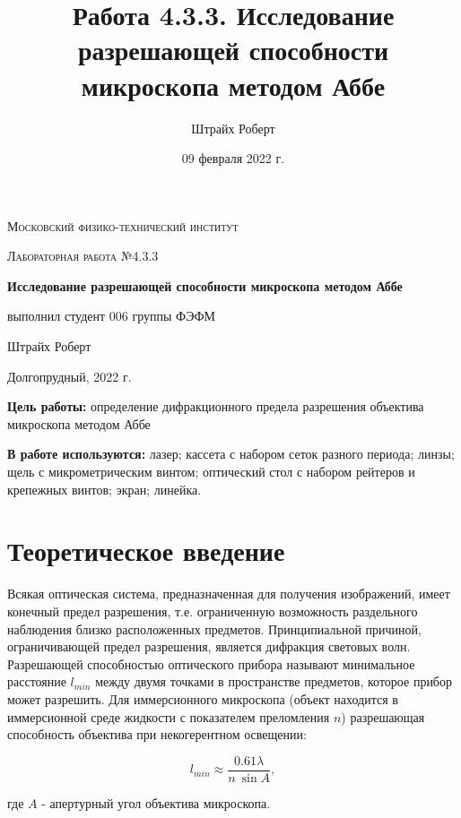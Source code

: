 \documentclass[a4paper, 12pt]{article}
\author{Штрайх Роберт}
\title{Работа 4.3.3. Исследование разрешающей способности микроскопа методом Аббе}
\date{09 февраля 2022 г.}
\begin{document}
\begin{titlepage}
	\centering
	\vspace{5cm}
	{\scshape\LARGE Московский физико-технический институт \par}
	\vspace{4cm}
	{\scshape\Large Лабораторная работа №4.3.3 \par}
	\vspace{1cm}
	{\huge\bfseries Исследование разрешающей способности микроскопа методом Аббе\par}
	\vspace{1cm}
	\vfill
\begin{flushright}
	{\Large выполнил студент 006 группы ФЭФМ}\par
	\vspace{0.3cm}
	{\Large Штрайх Роберт}
\end{flushright}
	

	\vfill

	Долгопрудный, 2022 г.
\end{titlepage}

\newpage

\textbf{Цель работы:} определение дифракционного предела разрешения объектива микроскопа методом Аббе

\textbf{В работе используются:} лазер; кассета с набором сеток разного периода; линзы; щель с микрометрическим винтом; оптический стол с набором рейтеров и крепежных винтов; экран; линейка.

\section*{Теоретическое введение}

Всякая оптическая система, предназначенная для получения изображений, имеет конечный
предел разрешения, т.е. ограниченную возможность раздельного наблюдения близко расположенных
предметов. Принципиальной причиной, ограничивающей предел разрешения, является дифракция
световых волн. Разрешающей способностью оптического прибора называют минимальное
расстояние $l_{min}$ между двумя точками в пространстве предметов, которое прибор может
разрешить.
Для иммерсионного микроскопа (объект находится в иммерсионной среде жидкости с показателем
преломления $n$) разрешающая способность объектива при некогерентном освещении:

\[l_{min} \approx \dfrac{0.61\lambda}{n~\sin A},\]

где $A$ - апертурный угол объектива микроскопа. 
\end{document}
